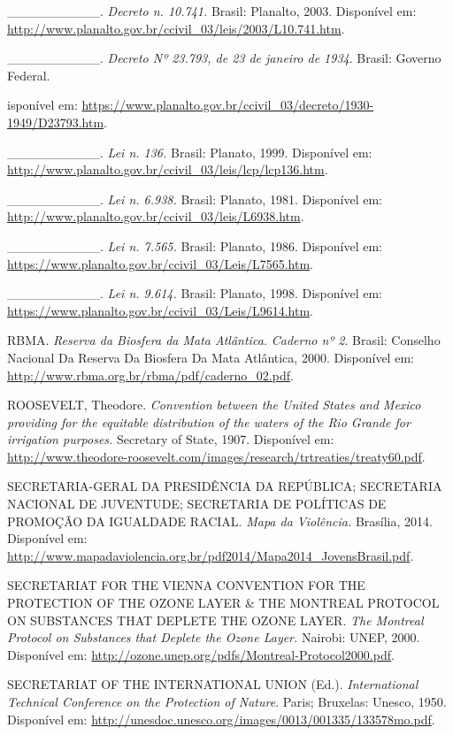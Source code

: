 \_\_\_\_\_\_\_\_\_\_. \emph{Decreto n. 10.741.} Brasil: Planalto, 2003.
Disponível em:
\url{http://www.planalto.gov.br/ccivil_03/leis/2003/L10.741.htm}.

\_\_\_\_\_\_\_\_\_\_. \emph{Decreto Nº 23.793, de 23 de janeiro de
1934}. Brasil: Governo Federal.

isponível em:
\url{https://www.planalto.gov.br/ccivil_03/decreto/1930-1949/D23793.htm}.

\_\_\_\_\_\_\_\_\_\_. \emph{Lei n. 136.} Brasil: Planato, 1999.
Disponível em:
\url{http://www.planalto.gov.br/ccivil_03/leis/lcp/lcp136.htm}.

\_\_\_\_\_\_\_\_\_\_. \emph{Lei n. 6.938.} Brasil: Planato, 1981.
Disponível em:
\url{http://www.planalto.gov.br/ccivil_03/leis/L6938.htm}.

\_\_\_\_\_\_\_\_\_\_. \emph{Lei n. 7.565.} Brasil: Planato, 1986.
Disponível em:
\url{https://www.planalto.gov.br/ccivil_03/Leis/L7565.htm}.

\_\_\_\_\_\_\_\_\_\_. \emph{Lei n. 9.614.} Brasil: Planato, 1998.
Disponível em:
\url{https://www.planalto.gov.br/ccivil_03/Leis/L9614.htm}.

RBMA. \emph{Reserva da Biosfera da Mata Atlântica.} \emph{Caderno nº 2}.
Brasil: Conselho Nacional Da Reserva Da Biosfera Da Mata Atlântica,
2000. Disponível em:
\url{http://www.rbma.org.br/rbma/pdf/caderno_02.pdf}.

ROOSEVELT, Theodore. \emph{Convention between the United States and
Mexico providing for the equitable distribution of the waters of the Rio
Grande for irrigation purposes.} Secretary of State, 1907. Disponível
em:
\url{http://www.theodore-roosevelt.com/images/research/trtreaties/treaty60.pdf}.

SECRETARIA-GERAL DA PRESIDÊNCIA DA REPÚBLICA; SECRETARIA NACIONAL DE
JUVENTUDE; SECRETARIA DE POLÍTICAS DE PROMOÇÃO DA IGUALDADE RACIAL.
\emph{Mapa da Violência.} Brasília, 2014. Disponível em:
\url{http://www.mapadaviolencia.org.br/pdf2014/Mapa2014_JovensBrasil.pdf}.

SECRETARIAT FOR THE VIENNA CONVENTION FOR THE PROTECTION OF THE OZONE
LAYER \& THE MONTREAL PROTOCOL ON SUBSTANCES THAT DEPLETE THE OZONE
LAYER. \emph{The Montreal Protocol on Substances that Deplete the Ozone
Layer.} Nairobi: UNEP, 2000. Disponível em:
\url{http://ozone.unep.org/pdfs/Montreal-Protocol2000.pdf}.

SECRETARIAT OF THE INTERNATIONAL UNION (Ed.). \emph{International
Technical Conference on the Protection of Nature}. Paris; Bruxelas:
Unesco, 1950. Disponível em:
\url{http://unesdoc.unesco.org/images/0013/001335/133578mo.pdf}.


